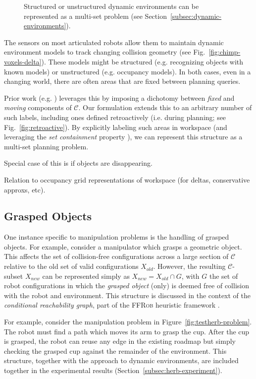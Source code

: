 \documentclass{report}
\begin{document}
\begin{figure}
\caption{
  Structured or unstructured dynamic environments
  can be represented as a multi-set problem
  (see Section~\ref{subsec:dynamic-environments}).}
\label{fig:dynamic-environments}
\end{figure}

The sensors on most articulated robots allow them to maintain
dynamic environment models to track changing collision geometry
(see Fig.~\ref{fig:chimp-voxels-delta}).
These models might be
structured (e.g. recognizing objects with known models)
or unstructured (e.g. occupancy models).
In both cases,
even in a changing world,
there are often areas that are fixed between planning queries.

Prior work (e.g. \cite{jaillet2004dynamicprm})
leverages this by imposing a dichotomy between
\emph{fixed} and \emph{moving} components of $\mathcal{C}$.
Our formulation extends this to an arbitrary number of such labels,
including ones defined retroactively (i.e. during planning;
see Fig.~\ref{fig:retroactive}).
By explicitly labeling such areas in workspace
(and leveraging the \emph{set containment} property
\cite{newmanbranicky1991cspacetransforms}),
we can represent this structure as a multi-set planning problem.

Special case of this is if objects are disappearing.

Relation to occupancy grid representations of workspace
(for deltas, conservative approxs, etc).

\subsection{Grasped Objects}
\label{subsec:grasped-objects}

One instance specific to manipulation problems is the handling of
grasped objects.
For example, 
consider a manipulator which grasps a geometric object.
This affects the set of collision-free configurations
across a large section of $\mathcal{C}$
relative to the old set of valid configurations $X_{old}$.
However,
the resulting $\mathcal{C}$-subset $X_{new}$
can be represented simply as
$X_{new} = X_{old} \cap G$,
with $G$ the set of robot configurations in which
the \emph{grasped object} (only)
is deemed free of collision with the robot and environment.
This structure is discussed in the context of the
\emph{conditional reachability graph},
part of the \textsc{FFRob} heuristic framework
\cite{garrett2014ffrob}.

For example,
consider the manipulation problem in
Figure~\ref{fig:testherb-problem}.
The robot must find a path which moves its arm to grasp the cup.
After the cup is grasped,
the robot can reuse any edge in the existing roadmap
but simply checking the grasped cup
against the remainder of the environment.
This structure,
together with the approach to dynamic environments,
are included together in the experimental results
(Section~\ref{subsec:herb-experiment}).
\end{document}
